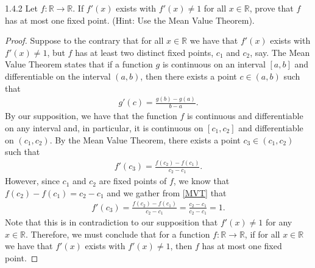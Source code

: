 \begin{problem}{1.4.2}
  Let $f: \mathbb{R} \to \mathbb{R}$. If $f'(x)$ exists with $f'(x) \neq 1$ for
  all $x \in \mathbb{R}$, prove that $f$ has at most one fixed point.
  (Hint: Use the Mean Value Theorem).
\end{problem}

\begin{proof}
  Suppose to the contrary that for all $x\in\mathbb{R}$ we have that $f'(x)$ exists
  with $f'(x) \neq 1$, but $f$ has at least two distinct fixed points, $c_1$ and $c_2$, say.
  The Mean Value Theorem states that if a function $g$ is continuous on an interval
  $[a, b]$ and differentiable on the interval $(a, b)$, then there exists a point $c \in (a, b)$
  such that
  \begin{align*}
    g'(c) = \frac{g(b)- g(a)}{b - a}.
  \end{align*}
  By our supposition, we have that the function $f$ is continuous and differentiable
  on any interval and, in particular, it is continuous on $[c_1, c_2]$ and differentiable
  on $(c_1, c_2)$. By the Mean Value Theorem, there exists a point $c_3 \in (c_1, c_2)$
  such that
  \begin{align}\label{MVT}
    f'(c_3) = \frac{f(c_2)- f(c_1)}{c_2 - c_1}.
  \end{align}
  However, since $c_1$ and $c_2$ are fixed points of $f$, we know that $f(c_2)- f(c_1) = c_2 - c_1$
  and we gather from \eqref{MVT} that
  \begin{align*}
    f'(c_3) = \frac{f(c_2)- f(c_1)}{c_2 - c_1} = \frac{c_2 - c_1}{c_2 - c_1} = 1.
  \end{align*}
  Note that this is in contradiction to our supposition that $f'(x) \neq 1$ for
  any $x \in \mathbb{R}$. Therefore, we must conclude that for a function
  $f: \mathbb{R} \to \mathbb{R}$, if for all $x\in\mathbb{R}$ we have that $f'(x)$ exists
  with $f'(x) \neq 1$, then $f$ has at most one fixed point.
\end{proof}
\newpage
